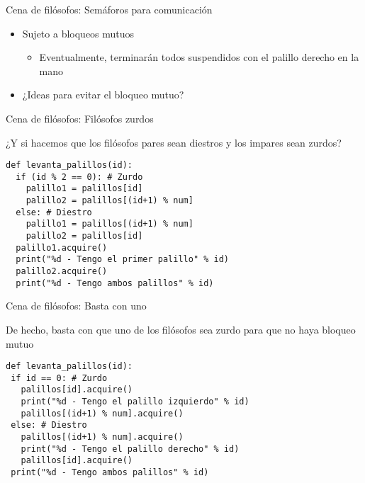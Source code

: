 \documentclass[presentation]{beamer}
\begin{document}
\begin{frame}[label={sec:orgb5b27cb}]{Cena de filósofos: Semáforos para comunicación}
\begin{itemize}
\item Sujeto a bloqueos mutuos
\begin{itemize}
\item Eventualmente, terminarán todos suspendidos con el palillo
derecho en la mano
\end{itemize}
\item ¿Ideas para evitar el bloqueo mutuo?
\end{itemize}
\end{frame}

\begin{frame}[label={sec:orgf115468},fragile]{Cena de filósofos: Filósofos zurdos}
 \begin{center}
¿Y si hacemos que los filósofos pares sean diestros y los impares
sean zurdos?
\end{center}
\begin{verbatim}
def levanta_palillos(id):
  if (id % 2 == 0): # Zurdo
    palillo1 = palillos[id]
    palillo2 = palillos[(id+1) % num]
  else: # Diestro
    palillo1 = palillos[(id+1) % num]
    palillo2 = palillos[id]
  palillo1.acquire()
  print("%d - Tengo el primer palillo" % id)
  palillo2.acquire()
  print("%d - Tengo ambos palillos" % id)
\end{verbatim}
\end{frame}

\begin{frame}[label={sec:org2ec447d},fragile]{Cena de filósofos: Basta con uno}
 \begin{center}
De hecho, basta con que uno de los filósofos sea zurdo para que no
haya bloqueo mutuo
\end{center}
\begin{verbatim}
def levanta_palillos(id):
 if id == 0: # Zurdo
   palillos[id].acquire()
   print("%d - Tengo el palillo izquierdo" % id)
   palillos[(id+1) % num].acquire()
 else: # Diestro
   palillos[(id+1) % num].acquire()
   print("%d - Tengo el palillo derecho" % id)
   palillos[id].acquire()
 print("%d - Tengo ambos palillos" % id)
\end{verbatim}
\end{frame}
\end{document}
